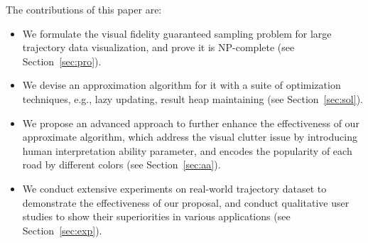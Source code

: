 The contributions of this paper are:
\begin{itemize}[noitemsep]
  \item We formulate the visual fidelity guaranteed sampling problem for large trajectory data visualization, and prove it is NP-complete (see Section~\ref{sec:pro}).
  \item We devise an approximation algorithm for it with a suite of optimization techniques, e.g., lazy updating, result heap maintaining (see Section~\ref{sec:sol}).
  \item We propose an advanced approach to further enhance the effectiveness of our approximate algorithm, which address the visual clutter issue by introducing human interpretation ability parameter,
  and encodes the popularity of each road by different colors (see Section~\ref{sec:aa}). 
  \item We conduct extensive experiments on real-world trajectory dataset to demonstrate the effectiveness of our proposal, and conduct qualitative user studies to show their superiorities in various applications
  (see Section~\ref{sec:exp}).
\end{itemize}



%


